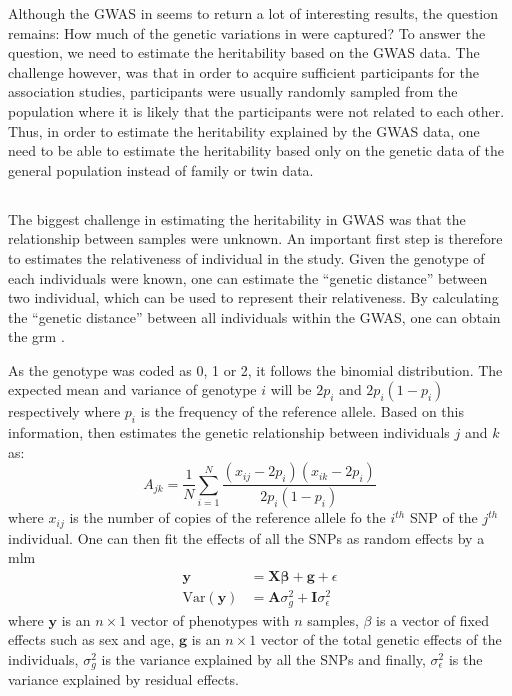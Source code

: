 	Although the \gls{GWAS} in  seems to return a lot of interesting results, the question remains: How much of the genetic variations in  were captured?
	To answer the question, we need to estimate the heritability based on the \gls{GWAS} data. 
	The challenge however, was that in order to acquire sufficient participants for the association studies, participants were usually randomly sampled from the population where it is likely that the participants were not related to each other.
	Thus, in order to estimate the heritability explained by the \gls{GWAS} data, one need to be able to estimate the heritability based only on the genetic data of the general population instead of family or twin data.
	
	\subsection{}
	The biggest challenge in estimating the heritability in \gls{GWAS} was that the relationship between samples were unknown.
	An important first step is therefore to estimates the relativeness of individual in the study.
	Given the genotype of each individuals were known, one can estimate the ``genetic distance'' between two individual, which can be used to represent their relativeness.
	By calculating the ``genetic distance'' between all individuals within the \gls{GWAS}, one can obtain the \gls{grm} \citep{Yang2011}.
	
	
	As the genotype was coded as 0, 1 or 2, it follows the binomial distribution.
	The expected mean and variance of genotype $i$ will be $2p_i$ and $2p_i(1-p_i)$ respectively where $p_i$ is the frequency of the reference allele.
	Based on this information, \citet{Yang2011} then estimates the genetic relationship between individuals $j$ and $k$ as:
	\begin{equation}
	A_{jk} = \frac{1}{N}\sum^N_{i=1}\frac{(x_{ij}-2p_i)(x_{ik}-2p_i)}{2p_i(1-p_i)}
	\end{equation}
	where $x_{ij}$ is the number of copies of the reference allele fo the $i^{th}$ \gls{SNP} of the $j^{th}$ individual.
	One can then fit the effects of all the \glspl{SNP} as random effects by a \gls{mlm}
	\begin{align}
	\boldsymbol{y} &= \boldsymbol{X\beta}+\boldsymbol{g}+\epsilon\\
	\mathrm{Var}(\boldsymbol{y}) &= \boldsymbol{A}\sigma_g^2+\boldsymbol{I}\sigma_\epsilon^2
	\end{align}
	where $\boldsymbol{y}$ is an $n\times 1$ vector of phenotypes with $n$ samples, $\beta$ is a vector of fixed effects such as sex and age, $\boldsymbol{g}$ is an $n\times 1$ vector of the total genetic effects of the individuals, $\sigma_g^2$ is the variance explained by all the \glspl{SNP} and finally, $\sigma_\epsilon^2$ is the variance explained by residual effects.
	
